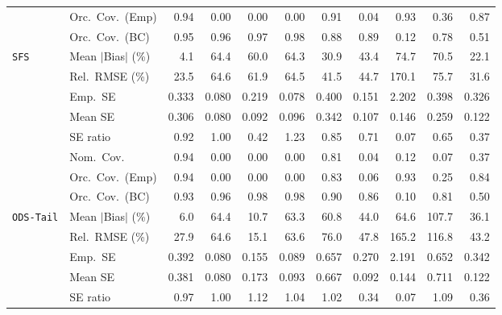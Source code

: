 \begin{landscape}
\begin{longtable}{llrrrrrrrrr}
 & Orc.\ Cov.\ (Emp) & \cellcolor{rankone}0.94 & 0.00 & 0.00 & 0.00 & \cellcolor{rankthree}0.91 & 0.04 & \cellcolor{ranktwo}0.93 & 0.36 & 0.87 \\
 & Orc.\ Cov.\ (BC) & \cellcolor{rankone}0.95 & \cellcolor{ranktwo}0.96 & \cellcolor{rankthree}0.97 & 0.98 & 0.88 & 0.89 & 0.12 & 0.78 & 0.51 \\
\addlinespace[2pt]
\quad \texttt{SFS} & Mean $|$Bias$|$ (\%) & \cellcolor{rankone}4.1 & 64.4 & 60.0 & 64.3 & \cellcolor{rankthree}30.9 & 43.4 & 74.7 & 70.5 & \cellcolor{ranktwo}22.1 \\
 & Rel.\ RMSE (\%) & \cellcolor{rankone}23.5 & 64.6 & 61.9 & 64.5 & \cellcolor{rankthree}41.5 & 44.7 & 170.1 & 75.7 & \cellcolor{ranktwo}31.6 \\
 & Emp.\ SE & 0.333 & 0.080 & 0.219 & 0.078 & 0.400 & 0.151 & 2.202 & 0.398 & 0.326 \\
 & Mean SE & 0.306 & 0.080 & 0.092 & 0.096 & 0.342 & 0.107 & 0.146 & 0.259 & 0.122 \\
 & SE ratio & \cellcolor{ranktwo}0.92 & \cellcolor{rankone}1.00 & 0.42 & 1.23 & \cellcolor{rankthree}0.85 & 0.71 & 0.07 & 0.65 & 0.37 \\
 & Nom.\ Cov. & \cellcolor{rankone}0.94 & 0.00 & 0.00 & 0.00 & \cellcolor{ranktwo}0.81 & 0.04 & 0.12 & 0.07 & \cellcolor{rankthree}0.37 \\
 & Orc.\ Cov.\ (Emp) & \cellcolor{rankone}0.94 & 0.00 & 0.00 & 0.00 & 0.83 & 0.06 & \cellcolor{ranktwo}0.93 & 0.25 & \cellcolor{rankthree}0.84 \\
 & Orc.\ Cov.\ (BC) & \cellcolor{ranktwo}0.93 & \cellcolor{rankone}0.96 & \cellcolor{rankthree}0.98 & \cellcolor{rankthree}0.98 & 0.90 & 0.86 & 0.10 & 0.81 & 0.50 \\
\addlinespace[2pt]
\quad \texttt{ODS-Tail} & Mean $|$Bias$|$ (\%) & \cellcolor{rankone}6.0 & 64.4 & \cellcolor{ranktwo}10.7 & 63.3 & 60.8 & 44.0 & 64.6 & 107.7 & \cellcolor{rankthree}36.1 \\
 & Rel.\ RMSE (\%) & \cellcolor{ranktwo}27.9 & 64.6 & \cellcolor{rankone}15.1 & 63.6 & 76.0 & 47.8 & 165.2 & 116.8 & \cellcolor{rankthree}43.2 \\
 & Emp.\ SE & 0.392 & 0.080 & 0.155 & 0.089 & 0.657 & 0.270 & 2.191 & 0.652 & 0.342 \\
 & Mean SE & 0.381 & 0.080 & 0.173 & 0.093 & 0.667 & 0.092 & 0.144 & 0.711 & 0.122 \\
 & SE ratio & \cellcolor{rankthree}0.97 & \cellcolor{rankone}1.00 & 1.12 & 1.04 & \cellcolor{ranktwo}1.02 & 0.34 & 0.07 & 1.09 & 0.36 \\

\end{longtable}
\end{landscape}
